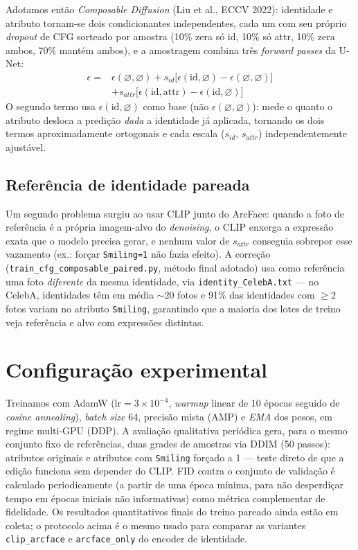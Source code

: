 \documentclass[9pt,twocolumn]{extarticle}
\begin{document}
Adotamos então \emph{Composable Diffusion} (Liu et al., ECCV 2022): identidade e atributo tornam-se dois condicionantes independentes, cada um com seu próprio \emph{dropout} de CFG sorteado por amostra (10\% zera só id, 10\% só attr, 10\% zera ambos, 70\% mantém ambos), e a amostragem combina três \emph{forward passes} da U-Net:
\begin{equation}
\begin{aligned}
\epsilon = {} & \epsilon(\varnothing,\varnothing) + s_{id}\big[\epsilon(\mathrm{id},\varnothing) - \epsilon(\varnothing,\varnothing)\big] \\
& + s_{attr}\big[\epsilon(\mathrm{id},\mathrm{attr}) - \epsilon(\mathrm{id},\varnothing)\big]
\end{aligned}
\label{eq:composable}
\end{equation}
O segundo termo usa $\epsilon(\mathrm{id},\varnothing)$ como base (não $\epsilon(\varnothing,\varnothing)$): mede o quanto o atributo desloca a predição \emph{dada} a identidade já aplicada, tornando os dois termos aproximadamente ortogonais e cada escala ($s_{id}$, $s_{attr}$) independentemente ajustável.

\subsection{Referência de identidade pareada}
Um segundo problema surgiu ao usar CLIP junto do ArcFace: quando a foto de referência é a própria imagem-alvo do \emph{denoising}, o CLIP enxerga a expressão exata que o modelo precisa gerar, e nenhum valor de $s_{attr}$ conseguia sobrepor esse vazamento (ex.: forçar \texttt{Smiling=1} não fazia efeito). A correção (\texttt{train\_cfg\_composable\_paired.py}, método final adotado) usa como referência uma foto \emph{diferente} da mesma identidade, via \texttt{identity\_CelebA.txt} --- no CelebA, identidades têm em média $\sim$20 fotos e 91\% das identidades com $\ge2$ fotos variam no atributo \texttt{Smiling}, garantindo que a maioria dos lotes de treino veja referência e alvo com expressões distintas.

\section{Configuração experimental}
Treinamos com AdamW ($\mathrm{lr}=3\times10^{-4}$, \emph{warmup} linear de 10 épocas seguido de \emph{cosine annealing}), \emph{batch size} 64, precisão mista (AMP) e \emph{EMA} dos pesos, em regime multi-GPU (DDP). A avaliação qualitativa periódica gera, para o mesmo conjunto fixo de referências, duas grades de amostras via DDIM (50 passos): atributos originais e atributos com \texttt{Smiling} forçado a 1 --- teste direto de que a edição funciona sem depender do CLIP. FID contra o conjunto de validação é calculado periodicamente (a partir de uma época mínima, para não desperdiçar tempo em épocas iniciais não informativas) como métrica complementar de fidelidade. Os resultados quantitativos finais do treino pareado ainda estão em coleta; o protocolo acima é o mesmo usado para comparar as variantes \texttt{clip\_arcface} e \texttt{arcface\_only} do encoder de identidade.
\end{document}
